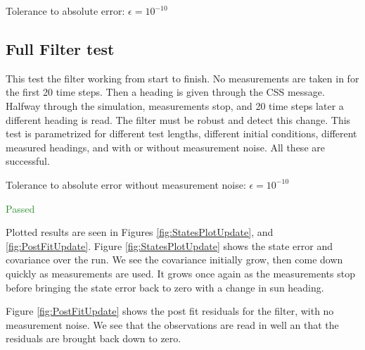 \documentclass[]{BasiliskReportMemo}
\begin{document}
Tolerance to absolute error: $\epsilon = 10^{-10}$

\subsection{Full Filter test}

This test the filter working from start to finish. No measurements are taken in for the first 20 time steps. Then a heading is given through the CSS message. Halfway through the simulation, measurements stop, and 20 time steps later a different heading is read. The filter must be robust and detect this change. This test is parametrized for different test lengths, different initial conditions, different measured headings, and with or without measurement noise. All these are successful.

\vspace{0.2cm}
Tolerance to absolute error without measurement noise: $\epsilon = 10^{-10}$

\textcolor{ForestGreen}{Passed}

Plotted results are seen in Figures \ref{fig:StatesPlotUpdate}, and \ref{fig:PostFitUpdate}. Figure \ref{fig:StatesPlotUpdate} shows the state error and covariance over the run. We see the covariance initially grow, then come down quickly as measurements are used. It grows once again as the measurements stop before bringing the state error back to zero with a change in sun heading. 

Figure \ref{fig:PostFitUpdate} shows the post fit residuals for the filter, with no measurement noise. We see that the observations are read in well an that the residuals are brought back down to zero.





\end{document}
